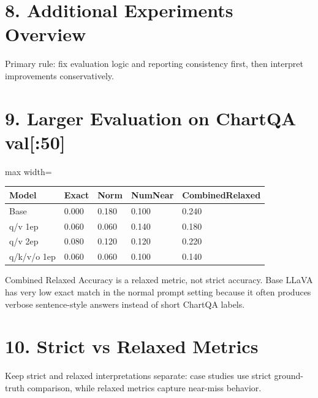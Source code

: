 \documentclass[11pt]{article}
\begin{document}
\section*{8. Additional Experiments Overview}
Primary rule: fix evaluation logic and reporting consistency first, then interpret improvements conservatively.

\section*{9. Larger Evaluation on ChartQA val[:50]}
\begin{center}\scriptsize\begin{adjustbox}{max width=\textwidth}
\begin{tabular}{lllll}
\toprule
Model & Exact & Norm & NumNear & CombinedRelaxed \\
\midrule
Base & 0.000 & 0.180 & 0.100 & 0.240 \\
q/v 1ep & 0.060 & 0.060 & 0.140 & 0.180 \\
q/v 2ep & 0.080 & 0.120 & 0.120 & 0.220 \\
q/k/v/o 1ep & 0.060 & 0.060 & 0.100 & 0.140 \\
\bottomrule
\end{tabular}
\end{adjustbox}\end{center}
Combined Relaxed Accuracy is a relaxed metric, not strict accuracy. Base LLaVA has very low exact match in the normal prompt setting because it often produces verbose sentence-style answers instead of short ChartQA labels.

\section*{10. Strict vs Relaxed Metrics}
Keep strict and relaxed interpretations separate: case studies use strict ground-truth comparison, while relaxed metrics capture near-miss behavior.
\end{document}
